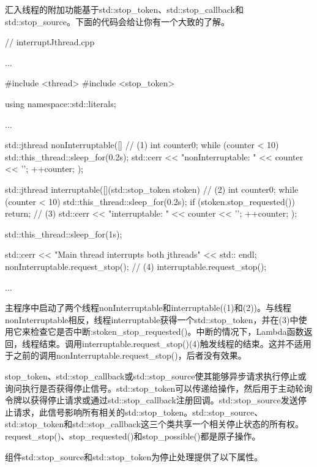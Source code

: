 汇入线程的附加功能基于std::stop\_token、std::stop\_callback和std::stop\_source。下面的代码会给让你有一个大致的了解。


\begin{cpp}
// interruptJthread.cpp

...

#include <thread>
#include <stop_token>

using namespace::std::literals;

...

std::jthread nonInterruptable([]{ // (1)
	int counter{0};
	while (counter < 10){
		std::this_thread::sleep_for(0.2s);
		std::cerr << "nonInterruptable: " << counter << '\n';
		++counter;
	}
});

std::jthread interruptable([](std::stop_token stoken){ // (2)
	int counter{0};
	while (counter < 10){
		std::this_thread::sleep_for(0.2s);
		if (stoken.stop_requested()) return; // (3)
		std::cerr << "interruptable: " << counter << '\n';
		++counter;
	}
});

std::this_thread::sleep_for(1s);

std::cerr << "Main thread interrupts both jthreads" << std:: endl;
nonInterruptable.request_stop(); // (4)
interruptable.request_stop();

...
\end{cpp}

主程序中启动了两个线程nonInterruptable和interruptable((1)和(2))。与线程nonInterruptable相反，线程interruptable获得一个std::stop\_token，并在(3)中使用它来检查它是否中断:stoken\_stop\_requested()。中断的情况下，Lambda函数返回，线程结束。调用interruptable.request\_stop()(4)触发线程的结束。这并不适用于之前的调用nonInterruptable.request\_stop()，后者没有效果。




stop\_token、std::stop\_callback或std::stop\_source使其能够异步请求执行停止或询问执行是否获得停止信号。std::stop\_token可以传递给操作，然后用于主动轮询令牌以获得停止请求或通过std::stop\_callback注册回调。std::stop\_source发送停止请求，此信号影响所有相关的std::stop\_token。std::stop\_source、std::stop\_token和std::stop\_callback这三个类共享一个相关停止状态的所有权。request\_stop()、stop\_requested()和stop\_possible()都是原子操作。

组件std::stop\_source和std::stop\_token为停止处理提供了以下属性。

